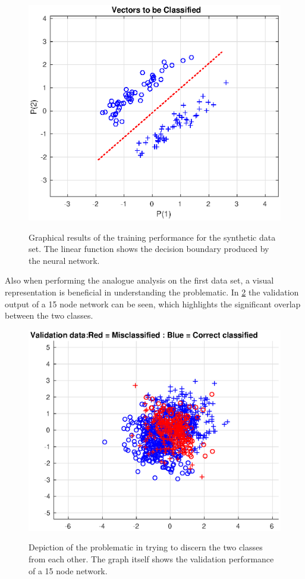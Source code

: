\documentclass[a4paper,12pt]{article}
\theoremstyle{plain}
\theoremstyle{definition}
\begin{document}
      \begin{figure}[H]
         \centering
         \includegraphics[scale=.6]{6}
         \label{fig:6}
         \caption{Graphical results of the training performance for the synthetic
         data set. The linear function shows the decision boundary produced by the
         neural network.}
      \end{figure}

      Also when performing the analogue analysis on the first data set, a visual
      representation is beneficial in understanding the problematic. In
      \cref{fig:8_data} the validation output of a 15 node network can be seen, which
      highlights the significant overlap between the two classes.
      
      \begin{figure}[H]
         \centering
         \includegraphics[scale=.6]{8_data}
         \label{fig:8_data}
         \caption{Depiction of the problematic in trying to discern the two
         classes from each other. The graph itself shows the validation performance of a
         15 node network.}
      \end{figure}
\end{document}
